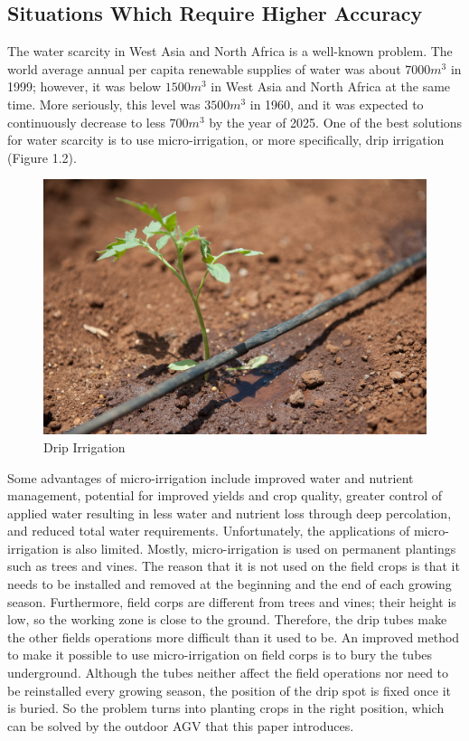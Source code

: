 \documentclass[letterpaper,12pt,oneside]{book}
\begin{document}
		\subsection{Situations Which Require Higher Accuracy}
		The water scarcity in West Asia and North Africa is a well-known problem. The world average annual per capita renewable supplies of water was about $7000 m^{3}$ in 1999; however, it was below $1500 m^{3}$ in West Asia and North Africa at the same time. More seriously, this level was $3500 m^{3}$ in 1960, and it was expected to continuously decrease to less $700 m^{3}$ by the year of 2025. \cite{margat1999water} One of the best solutions for water scarcity is to use micro-irrigation, or more specifically, drip irrigation (Figure 1.2). 
		\begin{figure}[ht!]
			\begin{center}
				\includegraphics[scale = 0.2]{drip.jpg}
				\caption{Drip Irrigation}
			\end{center}
		\end{figure}
		Some advantages of micro-irrigation include improved water and nutrient management, potential for improved yields and crop quality, greater control of applied water resulting in less water and nutrient loss through deep percolation, and reduced total water requirements. \cite{phene1986advantages} Unfortunately, the applications of micro-irrigation is also limited. Mostly, micro-irrigation is used on permanent plantings such as trees and vines. The reason that it is not used on the field crops is that it needs to be installed and removed at the beginning and the end of each growing season. Furthermore, field corps are different from trees and vines; their height is low, so the working zone is close to the ground. Therefore, the drip tubes make the other fields operations more difficult than it used to be. An improved method to make it possible to use micro-irrigation on field corps is to bury the tubes underground. \cite{camp1998subsurface} Although the tubes neither affect the field operations nor need to be reinstalled every growing season, the position of the drip spot is fixed once it is buried. So the problem turns into planting crops in the right position, which can be solved by the outdoor AGV that this paper introduces. 
		
\end{document}

